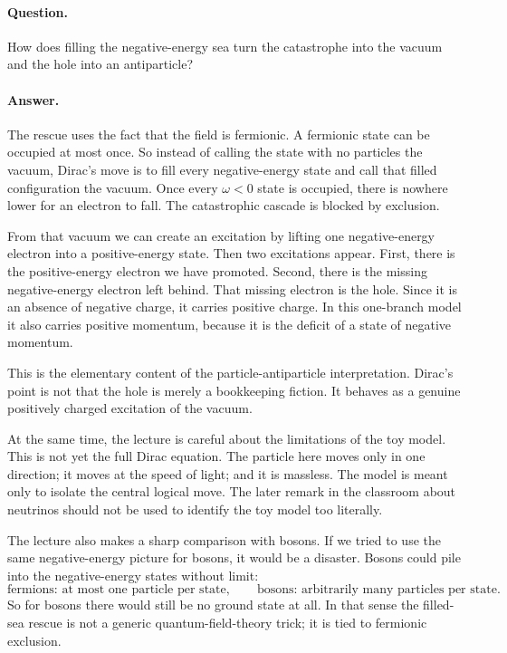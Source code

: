\paragraph{Question.} How does filling the negative-energy sea turn the catastrophe into the vacuum and the hole into an antiparticle?

\paragraph{Answer.} The rescue uses the fact that the field is fermionic. A fermionic state can be occupied at most once. So instead of calling the state with no particles the vacuum, Dirac's move is to fill every negative-energy state and call that filled configuration the vacuum. Once every \(\omega<0\) state is occupied, there is nowhere lower for an electron to fall. The catastrophic cascade is blocked by exclusion.

From that vacuum we can create an excitation by lifting one negative-energy electron into a positive-energy state. Then two excitations appear. First, there is the positive-energy electron we have promoted. Second, there is the missing negative-energy electron left behind. That missing electron is the hole. Since it is an absence of negative charge, it carries positive charge. In this one-branch model it also carries positive momentum, because it is the deficit of a state of negative momentum.

This is the elementary content of the particle-antiparticle interpretation. Dirac's point is not that the hole is merely a bookkeeping fiction. It behaves as a genuine positively charged excitation of the vacuum.

At the same time, the lecture is careful about the limitations of the toy model. This is not yet the full Dirac equation. The particle here moves only in one direction; it moves at the speed of light; and it is massless. The model is meant only to isolate the central logical move. The later remark in the classroom about neutrinos should not be used to identify the toy model too literally.

The lecture also makes a sharp comparison with bosons. If we tried to use the same negative-energy picture for bosons, it would be a disaster. Bosons could pile into the negative-energy states without limit:
\begin{equation}
\text{fermions: at most one particle per state},
\qquad
\text{bosons: arbitrarily many particles per state}.
\end{equation}
So for bosons there would still be no ground state at all. In that sense the filled-sea rescue is not a generic quantum-field-theory trick; it is tied to fermionic exclusion.

